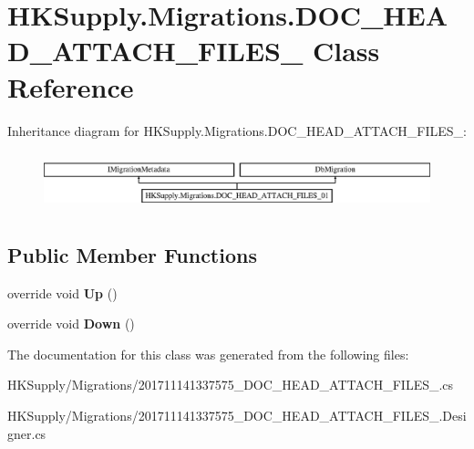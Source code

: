 \hypertarget{class_h_k_supply_1_1_migrations_1_1_d_o_c___h_e_a_d___a_t_t_a_c_h___f_i_l_e_s__01}{}\section{H\+K\+Supply.\+Migrations.\+D\+O\+C\+\_\+\+H\+E\+A\+D\+\_\+\+A\+T\+T\+A\+C\+H\+\_\+\+F\+I\+L\+E\+S\+\_ Class Reference}
\label{class_h_k_supply_1_1_migrations_1_1_d_o_c___h_e_a_d___a_t_t_a_c_h___f_i_l_e_s__01}
Inheritance diagram for H\+K\+Supply.\+Migrations.\+D\+O\+C\+\_\+\+H\+E\+A\+D\+\_\+\+A\+T\+T\+A\+C\+H\+\_\+\+F\+I\+L\+E\+S\+\_\+:\begin{figure}[H]
\begin{center}
\leavevmode
\includegraphics[height=1.686747cm]{class_h_k_supply_1_1_migrations_1_1_d_o_c___h_e_a_d___a_t_t_a_c_h___f_i_l_e_s__01}
\end{center}
\end{figure}
\subsection*{Public Member Functions}
\begin{DoxyCompactItemize}
\item 
\mbox{\label{class_h_k_supply_1_1_migrations_1_1_d_o_c___h_e_a_d___a_t_t_a_c_h___f_i_l_e_s__01_a8e15ece9f82e8fad34f1e860bebae0fa}} 
override void {\bfseries Up} ()
\item 
\mbox{\label{class_h_k_supply_1_1_migrations_1_1_d_o_c___h_e_a_d___a_t_t_a_c_h___f_i_l_e_s__01_ac1bcc82200cb26fde6b860f16bca311d}} 
override void {\bfseries Down} ()
\end{DoxyCompactItemize}


The documentation for this class was generated from the following files\+:\begin{DoxyCompactItemize}
\item 
H\+K\+Supply/\+Migrations/201711141337575\+\_\+\+D\+O\+C\+\_\+\+H\+E\+A\+D\+\_\+\+A\+T\+T\+A\+C\+H\+\_\+\+F\+I\+L\+E\+S\+\_.\+cs\item 
H\+K\+Supply/\+Migrations/201711141337575\+\_\+\+D\+O\+C\+\_\+\+H\+E\+A\+D\+\_\+\+A\+T\+T\+A\+C\+H\+\_\+\+F\+I\+L\+E\+S\+\_.\+Designer.\+cs\end{DoxyCompactItemize}
